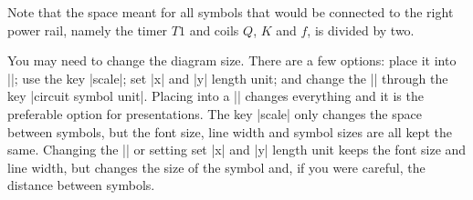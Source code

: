 \documentclass[a4paper]{ltxdoc}
\begin{document}
\noindent{}Note that the space meant for all symbols that would be connected to the right power rail, namely the timer $T1$ and coils $Q$, $K$ and $f$, is divided by two.

You may need to change the diagram size. There are a few options: place it into |\resizebox|; use the key |scale|; set |x| and |y| length unit; and change the |\tikzcircuitssizeunit| through the key |circuit symbol unit|. Placing into a |\resizebox| changes everything and it is the preferable option for presentations. The key |scale| only changes the space between symbols, but the font size, line width and symbol sizes are all kept the same. Changing the |\tikzcircuitssizeunit| or setting set |x| and |y| length unit keeps the font size and line width, but changes the size of the symbol and, if you were careful, the distance between symbols.
\end{document}
